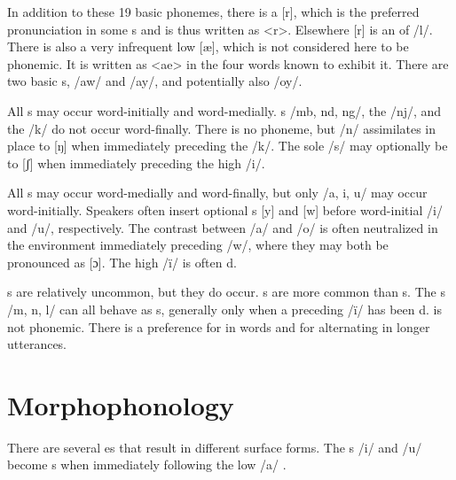 In addition to these 19 basic phonemes, there is a   [r], which is the preferred pronunciation in some s and is thus written as <r>. Elsewhere [r] is an  of /l/. There is also a very infrequent  low  [æ], which is not considered here to be phonemic. It is written as <ae> in the four words known to exhibit it. There are two basic s, /aw/ and /ay/, and potentially also /oy/.


All s may occur word-initially and word-medially.  s  /mb, nd, ng/, the   /nj/, and the    /k/ do not occur word-finally. There is no   phoneme, but  /n/  assimilates in place to [ŋ] when immediately preceding the   /k/. The sole  /s/ may optionally be  to [ʃ] when immediately preceding the  high  /i/.


All s may occur word-medially and word-finally, but only /a, i, u/ may occur word-initially. Speakers often insert optional s [y] and [w] before word-initial /i/ and /u/, respectively. The contrast between /a/ and /o/ is often neutralized in the environment immediately preceding /w/, where they may both be pronounced as [ɔ]. The  high  /ï/ is often d.


s are relatively uncommon, but they do occur. s are more common than s. The s /m, n, l/ can all behave as s, generally only when a preceding /ï/ has been d.  is not phonemic. There is a preference for   in  words and for alternating  in longer utterances.


\section{Morphophonology}\label{sec:overview:2.2}


There are several es that result in different surface forms. The s /i/ and /u/ become s when immediately following the  low  /a/ .

